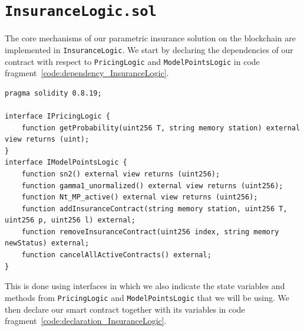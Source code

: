 \documentclass[10pt]{article}
\begin{document}
\section{\texttt{InsuranceLogic.sol}}\label{sec:InsuranceLogic_sol}
The core mechanisms of our parametric insurance solution on the blockchain are implemented in \texttt{InsuranceLogic}. We start by declaring the dependencies of our contract with respect to \texttt{PricingLogic} and \texttt{ModelPointsLogic} in code fragment~\ref{code:dependency_InsuranceLogic}.


\begin{codefragment}[!h]
\begin{lstlisting}[language=Solidity]
pragma solidity 0.8.19;

interface IPricingLogic {
    function getProbability(uint256 T, string memory station) external view returns (uint);
}
interface IModelPointsLogic {
    function sn2() external view returns (uint256);
    function gamma1_unormalized() external view returns (uint256);
    function Nt_MP_active() external view returns (uint256);
    function addInsuranceContract(string memory station, uint256 T, uint256 p, uint256 l) external;
    function removeInsuranceContract(uint256 index, string memory newStatus) external;
    function cancelAllActiveContracts() external;
}
\end{lstlisting}
    \caption{Dependency declaration of \texttt{InsuranceLogic} to \texttt{PricingLogic} and \texttt{ModelPointLogic} .}
    \label{code:dependency_InsuranceLogic}
\end{codefragment}

This is done using interfaces in which we also indicate the state variables and methods from \texttt{PricingLogic} and \texttt{ModelPointsLogic} that we will be using. We then declare our smart contract together with its variables in code fragment~\ref{code:declaration_InsuranceLogic}.
\end{document}
